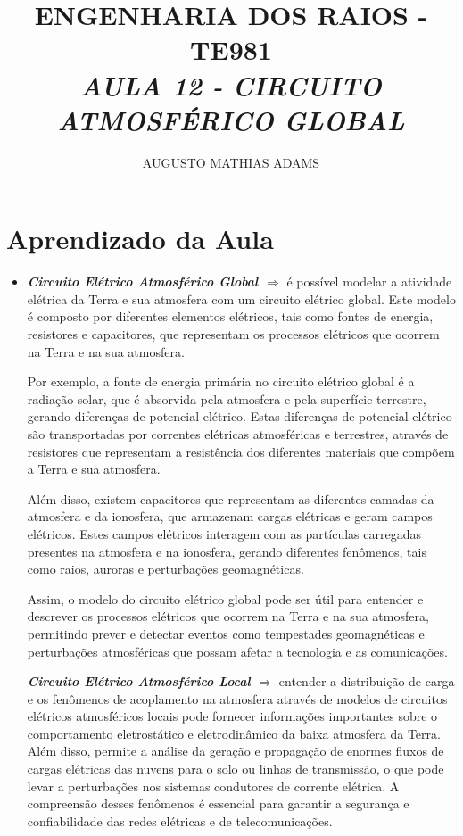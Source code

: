 \documentclass[a4paper, 12pt, onecolumn,singlespacing]{article}
\title{\normalsize{ENGENHARIA DOS RAIOS - TE981}\\ \huge{\textbf\textit{{AULA 12 - CIRCUITO ATMOSFÉRICO GLOBAL}}\\}}
\author{\small{AUGUSTO MATHIAS ADAMS}}
\begin{document}
	
	\maketitle
	
	\section{Aprendizado da Aula}
	
	\begin{itemize}
		
		\item \textbf{\textit{Circuito Elétrico Atmosférico Global $\Rightarrow$ }}é possível modelar a atividade elétrica da Terra e sua atmosfera com um circuito elétrico global. Este modelo é composto por diferentes elementos elétricos, tais como fontes de energia, resistores e capacitores, que representam os processos elétricos que ocorrem na Terra e na sua atmosfera.
		
		Por exemplo, a fonte de energia primária no circuito elétrico global é a radiação solar, que é absorvida pela atmosfera e pela superfície terrestre, gerando diferenças de potencial elétrico. Estas diferenças de potencial elétrico são transportadas por correntes elétricas atmosféricas e terrestres, através de resistores que representam a resistência dos diferentes materiais que compõem a Terra e sua atmosfera.
		
		Além disso, existem capacitores que representam as diferentes camadas da atmosfera e da ionosfera, que armazenam cargas elétricas e geram campos elétricos. Estes campos elétricos interagem com as partículas carregadas presentes na atmosfera e na ionosfera, gerando diferentes fenômenos, tais como raios, auroras e perturbações geomagnéticas.
		
		Assim, o modelo do circuito elétrico global pode ser útil para entender e descrever os processos elétricos que ocorrem na Terra e na sua atmosfera, permitindo prever e detectar eventos como tempestades geomagnéticas e perturbações atmosféricas que possam afetar a tecnologia e as comunicações.
		
		\subitem \textbf{\textit{Circuito Elétrico Atmosférico Local $\Rightarrow$ }}entender a distribuição de carga e os fenômenos de acoplamento na atmosfera através de modelos de circuitos elétricos atmosféricos locais pode fornecer informações importantes sobre o comportamento eletrostático e eletrodinâmico da baixa atmosfera da Terra. Além disso, permite a análise da geração e propagação de enormes fluxos de cargas elétricas das nuvens para o solo ou linhas de transmissão, o que pode levar a perturbações nos sistemas condutores de corrente elétrica. A compreensão desses fenômenos é essencial para garantir a segurança e confiabilidade das redes elétricas e de telecomunicações.
		

\end{itemize}
\end{document}
